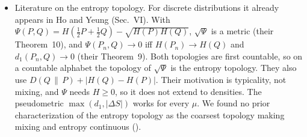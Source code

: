 \documentclass[11pt]{article}
\begin{document}
\begin{itemize}
  sufficient conditions, such as bounded densities, for convergence of differential entropy; the
  continuous case here is of this kind, with a uniform bound.
\item Literature on the entropy topology. For discrete distributions it already appears in Ho
  and Yeung (Sec.~VI). With $\Psi(P, Q) = H(\tfrac12 P + \tfrac12 Q) - \sqrt{H(P) H(Q)}$,
  $\sqrt\Psi$ is a metric (their Theorem~10), and $\Psi(P_n, Q) \to 0$ iff $H(P_n) \to H(Q)$ and
  $d_1(P_n, Q) \to 0$ (their Theorem~9). Both topologies are first countable, so on a countable
  alphabet the topology of $\sqrt\Psi$ is the entropy topology. They also use
  $D(Q \,\|\, P) + |H(Q) - H(P)|$. Their motivation is typicality, not mixing, and $\Psi$ needs
  $H \ge 0$, so it does not extend to densities. The pseudometric
  $\max(d_1, |\Delta S|)$ works for every $\mu$. We found no prior characterization of the
  entropy topology as the coarsest topology making mixing and entropy continuous
  ().
\end{itemize}
\end{document}
